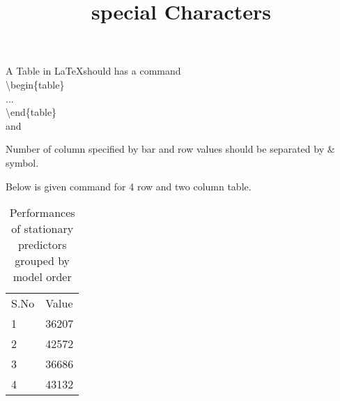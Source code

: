\documentclass{article}
\title{special Characters}
\begin{document}
A Table in \LaTeX should has a command \\
\newline
{\textbackslash}begin\{table\}\\
...\\
{\textbackslash}end\{table\}\\

and

Number of column specified by bar   and row values should be separated by $\&$ symbol.

Below is given command for 4 row and two column table. 

\begin{table}[ht]
    \caption{\label{tbl:spo}Performances of stationary predictors grouped by model order}
    \centering
    \begin{tabular}{ll}
	S.No & Value \\
	1 & 36207  \\
	2 & 42572  \\ 
	3 & 36686  \\
	4 & 43132  \\
    \end{tabular}
\end{table}
\end{document}
